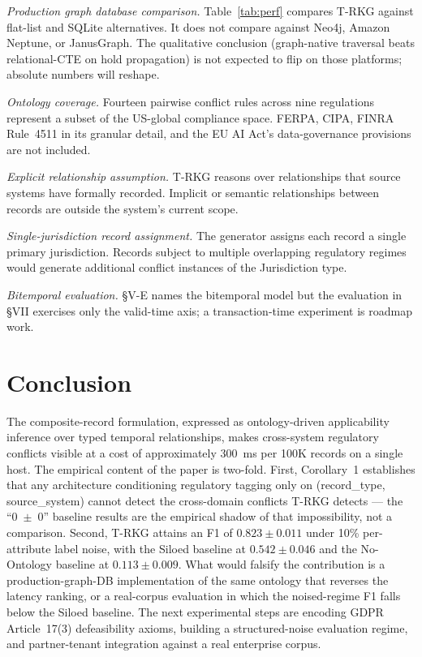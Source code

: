 \documentclass{ieeeaccess}
\begin{document}
\textit{Production graph database comparison.} Table~\ref{tab:perf} compares T-RKG against flat-list and SQLite alternatives. It does not compare against Neo4j, Amazon Neptune, or JanusGraph. The qualitative conclusion (graph-native traversal beats relational-CTE on hold propagation) is not expected to flip on those platforms; absolute numbers will reshape.

\textit{Ontology coverage.} Fourteen pairwise conflict rules across nine regulations represent a subset of the US-global compliance space. FERPA, CIPA, FINRA Rule~4511 in its granular detail, and the EU AI Act's data-governance provisions are not included.

\textit{Explicit relationship assumption.} T-RKG reasons over relationships that source systems have formally recorded. Implicit or semantic relationships between records are outside the system's current scope.

\textit{Single-jurisdiction record assignment.} The generator assigns each record a single primary jurisdiction. Records subject to multiple overlapping regulatory regimes would generate additional conflict instances of the Jurisdiction type.

\textit{Bitemporal evaluation.} §V-E names the bitemporal model but the evaluation in §VII exercises only the valid-time axis; a transaction-time experiment is roadmap work.

\section{Conclusion}

The composite-record formulation, expressed as ontology-driven applicability inference over typed temporal relationships, makes cross-system regulatory conflicts visible at a cost of approximately 300~ms per 100K records on a single host. The empirical content of the paper is two-fold. First, Corollary~1 establishes that any architecture conditioning regulatory tagging only on (record\_type, source\_system) cannot detect the cross-domain conflicts T-RKG detects --- the ``0~$\pm$~0'' baseline results are the empirical shadow of that impossibility, not a comparison. Second, T-RKG attains an F1 of $0.823 \pm 0.011$ under 10\% per-attribute label noise, with the Siloed baseline at $0.542 \pm 0.046$ and the No-Ontology baseline at $0.113 \pm 0.009$. What would falsify the contribution is a production-graph-DB implementation of the same ontology that reverses the latency ranking, or a real-corpus evaluation in which the noised-regime F1 falls below the Siloed baseline. The next experimental steps are encoding GDPR Article~17(3) defeasibility axioms, building a structured-noise evaluation regime, and partner-tenant integration against a real enterprise corpus.
\end{document}
